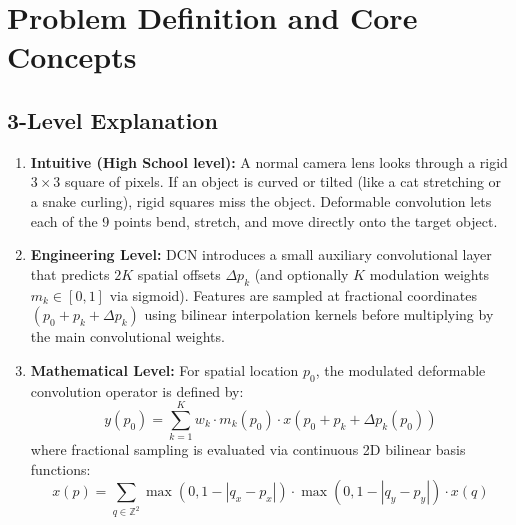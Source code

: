 \documentclass[11pt,a4paper]{article}
\theoremstyle{definition}
\begin{document}
\section{Problem Definition and Core Concepts}

\subsection{3-Level Explanation}
\begin{enumerate}
    \item \textbf{Intuitive (High School level):} A normal camera lens looks through a rigid $3 \times 3$ square of pixels. If an object is curved or tilted (like a cat stretching or a snake curling), rigid squares miss the object. Deformable convolution lets each of the 9 points bend, stretch, and move directly onto the target object.
    \item \textbf{Engineering Level:} DCN introduces a small auxiliary convolutional layer that predicts $2K$ spatial offsets $\Delta p_k$ (and optionally $K$ modulation weights $m_k \in [0, 1]$ via sigmoid). Features are sampled at fractional coordinates $(p_0 + p_k + \Delta p_k)$ using bilinear interpolation kernels before multiplying by the main convolutional weights.
    \item \textbf{Mathematical Level:} For spatial location $p_0$, the modulated deformable convolution operator is defined by:
    \begin{equation}
    y(p_0) = \sum_{k=1}^K w_k \cdot m_k(p_0) \cdot x(p_0 + p_k + \Delta p_k(p_0))
    \end{equation}
    where fractional sampling is evaluated via continuous 2D bilinear basis functions:
    \begin{equation}
    x(p) = \sum_{q \in \mathbb{Z}^2} \max(0, 1 - |q_x - p_x|) \cdot \max(0, 1 - |q_y - p_y|) \cdot x(q)
    \end{equation}
\end{enumerate}
\end{document}
